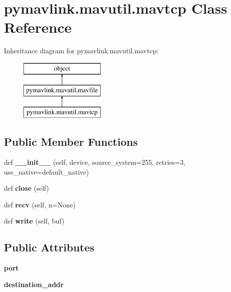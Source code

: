 \hypertarget{classpymavlink_1_1mavutil_1_1mavtcp}{}\section{pymavlink.\+mavutil.\+mavtcp Class Reference}
\label{classpymavlink_1_1mavutil_1_1mavtcp}
Inheritance diagram for pymavlink.\+mavutil.\+mavtcp\+:\begin{figure}[H]
\begin{center}
\leavevmode
\includegraphics[height=3.000000cm]{classpymavlink_1_1mavutil_1_1mavtcp}
\end{center}
\end{figure}
\subsection*{Public Member Functions}
\begin{DoxyCompactItemize}
\item 
\mbox{\label{classpymavlink_1_1mavutil_1_1mavtcp_a5c795ee045e42c2d3bd6f0fd2a1514eb}} 
def {\bfseries \+\_\+\+\_\+init\+\_\+\+\_\+} (self, device, source\+\_\+system=255, retries=3, use\+\_\+native=default\+\_\+native)
\item 
\mbox{\label{classpymavlink_1_1mavutil_1_1mavtcp_a4227bcbb84360f0016d9d4abb6af8107}} 
def {\bfseries close} (self)
\item 
\mbox{\label{classpymavlink_1_1mavutil_1_1mavtcp_a8c56a0ee4f9c42f36534cd36bca997e1}} 
def {\bfseries recv} (self, n=None)
\item 
\mbox{\label{classpymavlink_1_1mavutil_1_1mavtcp_abcc941efee4231016584e06c7cf07590}} 
def {\bfseries write} (self, buf)
\end{DoxyCompactItemize}
\subsection*{Public Attributes}
\begin{DoxyCompactItemize}
\item 
\mbox{\label{classpymavlink_1_1mavutil_1_1mavtcp_adb18344f59fadaccd747f90faf0e9aaf}} 
{\bfseries port}
\item 
\mbox{\label{classpymavlink_1_1mavutil_1_1mavtcp_a7a7efbeb3512d855ba5ed722ab5df2ec}} 
{\bfseries destination\+\_\+addr}
\end{DoxyCompactItemize}


